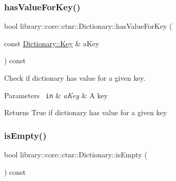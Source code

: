\subsubsection{\texorpdfstring{hasValueForKey()}{hasValueForKey()}}
{\footnotesize\ttfamily bool library\+::core\+::ctnr\+::\+Dictionary\+::has\+Value\+For\+Key (\begin{DoxyParamCaption}\item[{const \mbox{\hyperlink{classlibrary_1_1core_1_1ctnr_1_1_dictionary_a987cae687cce70d81a2a483c5e05e842}{Dictionary\+::\+Key}} \&}]{a\+Key }\end{DoxyParamCaption}) const}



Check if dictionary has value for a given key. 


\begin{DoxyCode}{0}
\end{DoxyCode}



\begin{DoxyParams}[1]{Parameters}
\mbox{\texttt{ in}}  & {\em a\+Key} & A key \\
\hline
\end{DoxyParams}
\begin{DoxyReturn}{Returns}
True if dictionary has value for a given key 
\end{DoxyReturn}
\mbox{\label{classlibrary_1_1core_1_1ctnr_1_1_dictionary_ae6d779460b52c84a71c34f86988c4590}} 
\subsubsection{\texorpdfstring{isEmpty()}{isEmpty()}}
{\footnotesize\ttfamily bool library\+::core\+::ctnr\+::\+Dictionary\+::is\+Empty (\begin{DoxyParamCaption}{ }\end{DoxyParamCaption}) const}



